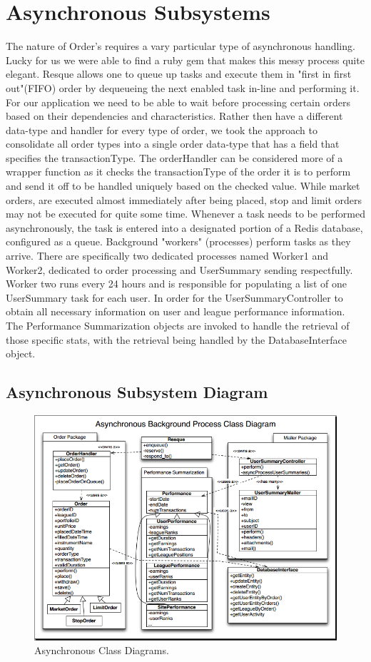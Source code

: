 \section{Asynchronous Subsystems}
The nature of Order's requires a vary particular type of asynchronous handling.  Lucky for us we were able to find a ruby gem that makes this messy process quite elegant.  Resque allows one to queue up tasks and execute them in "first in first out"(FIFO) order by dequeueing the next enabled task in-line and performing it.  For our application we need to be able to wait before processing certain orders based on their dependencies and characteristics.  Rather then have a different data-type and handler for every type of order, we took the approach to consolidate all order types into a single order data-type that has a field that specifies the transactionType.  The orderHandler can be considered more of a wrapper function as it checks the transactionType of the order it is to perform and send it off to be handled uniquely based on the checked value.  While market orders, are executed almost immediately after being placed, stop and limit orders may not be executed for quite some time.  Whenever a task needs to be performed asynchronously, the task is entered into a designated portion of a Redis database, configured as a queue. Background "workers" (processes) perform tasks as they arrive. There are specifically two dedicated processes named Worker1 and Worker2, dedicated to order processing and UserSummary sending respectfully.  Worker two runs every 24 hours and is responsible for populating a list of one UserSummary task for each user. In order for the UserSummaryController to obtain all necessary information on user and league performance information.  The Performance Summarization objects are invoked to handle the retrieval of those specific stats, with the retrieval being handled by the DatabaseInterface object.


\subsection{Asynchronous Subsystem Diagram}
\begin{figure}[b]
\centering
\includegraphics[width=5in]{./Diagrams/ClassDiagrams/cd2.png}
\caption{ Asynchronous Class Diagrams.}
\end{figure}


